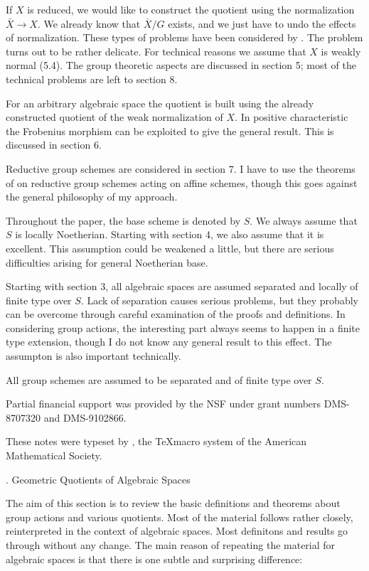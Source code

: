 If $X$ is reduced, we would like to construct the quotient using the
normalization $\bar X\to X$. We already know that $\bar X/G$ exists, and we
just have to undo the effects of normalization. These types of problems have
been considered by \cite{Artin70,6.3}.  The problem turns out to be rather
delicate. For technical reasons we
assume that $X$ is weakly normal (5.4).
The group theoretic aspects are discussed in section 5; most of the
technical problems are left to section 8.

For an arbitrary algebraic space the quotient is built  using
the already constructed quotient of the weak normalization of $X$. In positive
characteristic the Frobenius morphism can be exploited to give the general
result. This is discussed in section 6.

Reductive group schemes  are considered in section 7. I have to use the
theorems of
\cite{Seshadri77} on reductive group schemes acting on affine schemes, though
this goes against the general philosophy  of my approach.
\enddemo

 Throughout the paper, the base scheme is
denoted by
$S$. We always assume that $S$ is locally Noetherian. Starting with section 4,
we also assume that it is excellent. This assumption could be weakened a
little, but there are serious difficulties arising for general Noetherian base.

Starting with section 3, all algebraic spaces  are assumed separated and
locally of finite type over $S$.
Lack of separation  causes serious problems, but
they probably can be overcome through  careful examination of the proofs and
definitions. In considering group actions, the interesting part always seems
to happen in a  finite type extension, though I do not know any general result
to this effect. The assumpton is also important technically.

All group schemes are assumed to be separated and of finite type over $S$.
\enddemo


 Partial financial support was provided by the
NSF under grant numbers DMS-8707320 and DMS-9102866.

These notes were typeset by \AmSTeX, the \TeX macro system of the American
Mathematical Society.
\enddemo



. Geometric Quotients of Algebraic Spaces
\endhead

The aim of this section is to review the basic definitions and theorems about
group actions and various quotients. Most of the material follows
\cite{Mumford-Fogarty82, chapter 0} rather closely,  reinterpreted in the
context of algebraic spaces.  Most definitons and results go through without
any change. The
main reason of repeating  the material for
algebraic spaces is that there is one subtle and surprising difference:

